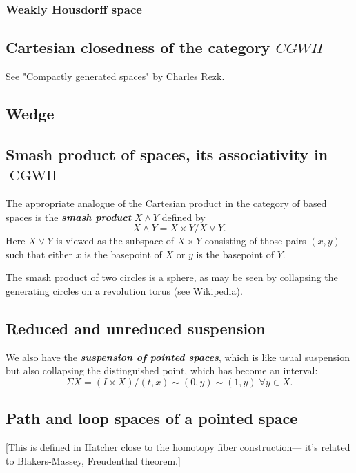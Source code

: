 \subsubsection{Weakly Housdorff space}

\subsection{Cartesian closedness of the category $CGWH$}
See "Compactly generated spaces" by Charles Rezk.

\subsection{Wedge}

\subsection{Smash product of spaces, its associativity in \texorpdfstring{$\operatorname{CGWH}$}{CGWH}}

The appropriate analogue of the Cartesian product in the category of based spaces is the \textbf{\textit{smash product}} $X\wedge Y$ defined by
	\[X\wedge Y=X\times Y/X\vee Y.\]
	Here $X\vee Y$ is viewed as the subspace of $X\times Y$ consisting of those pairs $(x,y)$ such that either $x$ is the basepoint of $X$ or $y$ is the basepoint of $Y$.
\begin{example}
	The smash product of two circles is a sphere, as may be seen by collapsing the generating circles on a revolution torus (see \href{https://en.wikipedia.org/wiki/Smash_product#/media/File:Visualization_of_the_smash_product_of_two_circles.gif}{Wikipedia}).
\end{example}

\subsection{Reduced and unreduced suspension}
We also have the \textbf{\textit{suspension of pointed spaces}}, which is like usual suspension but also collapsing the distinguished point, which has become an interval:
\[\Sigma X=(I\times X)/(t,x)\sim (0,y)\sim (1,y)\;\forall y\in X.\]

\subsection{Path and loop spaces of a pointed space}
[This is defined in Hatcher close to the homotopy fiber construction--- it's related to Blakers-Massey, Freudenthal theorem.]

